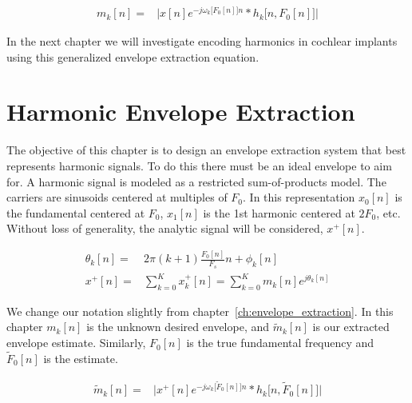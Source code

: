 \documentclass [11pt, proquest,oneside] {ganter_thesis}[2015/03/03]
\begin{document}
\begin{align}
\label{eq:envelope_extraction_general}
m_k[n] =& \Big| x[n]e^{-j \omega_k\Big[F_0[n]\Big]n} * h_k\big[n,F_0[n]\big]  \Big|
\end{align}

In the next chapter we will investigate encoding harmonics in cochlear implants using this generalized envelope extraction equation.





\chapter{Harmonic Envelope Extraction}\label{ch:harmonic_envelopes}

The objective of this chapter is to design an envelope extraction system that best represents harmonic signals.  To do this there must be an ideal envelope to aim for.  A harmonic signal is modeled as  a restricted sum-of-products model.  The carriers are sinusoids centered at multiples of $F_0$. In this representation $x_0[n]$ is the fundamental centered at $F_0$, $x_1[n]$ is the 1st harmonic centered at $2F_0$, etc.  Without loss of generality, the analytic signal will be considered, $x^+[n]$.

\begin{align}
\theta_k[n] =& 2\pi(k+1)\frac{F_0[n]}{F_s}n + \phi_k[n] \\
\label{eq:harmonic_SOP}
x^+[n] =& \sum\limits_{k=0}^K x_k^+[n] = \sum\limits_{k=0}^K m_k[n] e^{j\theta_k[n]}
\end{align}

We change our notation slightly from chapter~\ref{ch:envelope_extraction}.  In this chapter $m_k[n]$ is the unknown desired envelope, and $\tilde{m}_k[n]$ is our extracted envelope estimate.  Similarly, $F_0[n]$ is the true fundamental frequency and $\tilde{F}_0[n]$ is the estimate.

\begin{align}
\label{eq:envelope_extraction}
\tilde{m}_k[n] =& \Big| x^+[n]e^{-j \omega_k\big[\tilde{F}_0[n]\big]n} * h_k\big[n,\tilde{F}_0[n]\big]  \Big|
\end{align}
\end{document}
